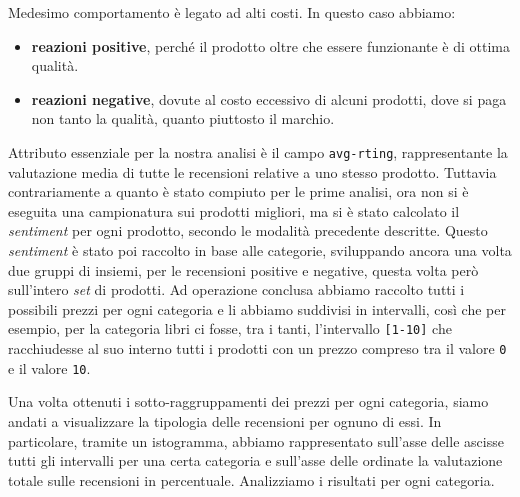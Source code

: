 		Medesimo comportamento è legato ad alti costi. In questo caso abbiamo:
		
		\begin{itemize}
			\item \textbf{reazioni positive}, perché il prodotto oltre che essere funzionante è di ottima qualità.
			\item \textbf{reazioni negative}, dovute al costo eccessivo di alcuni prodotti, dove si paga non tanto la qualità, quanto piuttosto il marchio.
		\end{itemize}
	
		Attributo essenziale per la nostra analisi è il campo \verb|avg-rting|, rappresentante la valutazione media di tutte le recensioni relative a uno stesso prodotto. Tuttavia
		contrariamente a quanto è stato compiuto per le prime analisi, ora non si è eseguita una campionatura sui prodotti migliori, ma si è stato calcolato il \textit{sentiment} per ogni prodotto, secondo le modalità precedente descritte. Questo \textit{sentiment} è stato poi raccolto in base alle categorie, sviluppando ancora una volta due gruppi di insiemi, per le recensioni positive e negative, questa volta però sull'intero \textit{set} di prodotti. Ad operazione conclusa abbiamo raccolto tutti i possibili prezzi per ogni categoria e li abbiamo suddivisi in intervalli, così che per esempio, per la categoria libri ci fosse, tra i tanti, l'intervallo \verb|[1-10]| che racchiudesse al suo interno tutti i prodotti con un prezzo compreso tra il valore \verb|0| e il valore \verb|10|. 

		Una volta ottenuti i sotto-raggruppamenti dei prezzi per ogni categoria, siamo andati a visualizzare la tipologia delle recensioni per ognuno di essi. In particolare, tramite un istogramma, abbiamo rappresentato sull'asse delle ascisse tutti gli intervalli per una certa categoria e sull'asse delle ordinate la valutazione totale sulle recensioni in percentuale. Analizziamo i risultati per ogni categoria.
		

